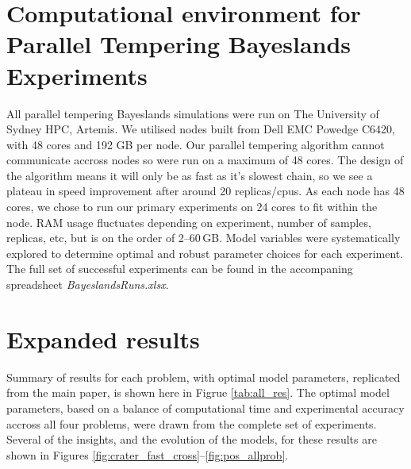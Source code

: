 \documentclass[preprint,1p,times]{elsarticle}
\begin{document}
 
\section{Computational environment for Parallel Tempering Bayeslands Experiments}
All parallel tempering Bayeslands simulations were run on The University of Sydney HPC, Artemis. We utilised nodes built from Dell EMC Powedge C6420, with 48 cores and 192 GB per node. Our parallel tempering algorithm cannot communicate accross nodes so were run on a maximum of 48 cores. The design of the algorithm means it will only be as fast as it's slowest chain, so we see a plateau in speed improvement after around 20 replicas/cpus. As each node has 48 cores, we chose to run our primary experiments on 24 cores to fit within the node. RAM usage fluctuates depending on experiment, number of samples, replicas, etc, but is on the order of 2--60\,GB. Model variables were systematically explored to determine optimal and robust parameter choices for each experiment. The full set of successful experiments can be found in the accompaning spreadsheet \textit{BayeslandsRuns.xlsx}.

\section{Expanded results}
Summary of results for each problem, with optimal model parameters, replicated from the main paper, is shown here in Figrue \ref{tab:all_res}. The optimal model parameters, based on a balance of computational time and experimental accuracy accross all four problems, were drawn from the complete set of experiments. Several of the insights, and the evolution of the models, for these results are shown in Figures \ref{fig:crater_fast_cross}--\ref{fig:pos_allprob}. 
 
\end{document}
